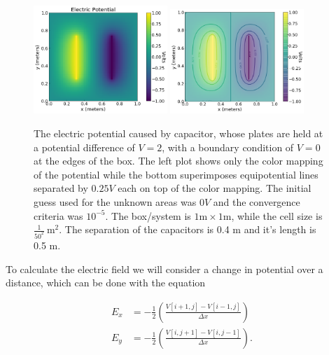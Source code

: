 \documentclass{report}
\begin{document}
            \begin{figure}[t]
                \centering
                \includegraphics[width=0.45\textwidth]{images/PotentialField.png}
                \includegraphics[width=0.45\textwidth]{images/PotentialFieldEquipotentials.png}
                \caption{The electric potential caused by capacitor, whose plates are held at a potential difference of $V=2$, with a boundary condition of $V=0$ at the edges of the box. The left plot shows only the color mapping of the potential while the bottom superimposes equipotential lines separated by $0.25 V$ each on top of the color mapping. The initial guess used for the unknown areas was $0 V$ and the convergence criteria was $10^{-5}$. The box/system is $1 \mathrm{m} \times 1 \mathrm{m}$, while the cell size is $\frac{1}{50^2} \ \mathrm{m^2}$. The separation of the capacitors is 0.4 m and it's length is 0.5 m.}
                \label{fig:PotentialField}
            \end{figure}
            
            To calculate the electric field we will consider a change in potential over a distance, which can be done with the equation
            
            \begin{equation} \label{eq:efieldcomponents}
                \begin{split}
                    E_x &=-\frac{1}{2}\left(\frac{V[i+1,j]-V[i-1,j]}{\Delta x}\right) \\
                    E_y &=-\frac{1}{2}\left(\frac{V[i,j+1]-V[i,j-1]}{\Delta x}\right).
                \end{split}
            \end{equation}
            
\end{document}
